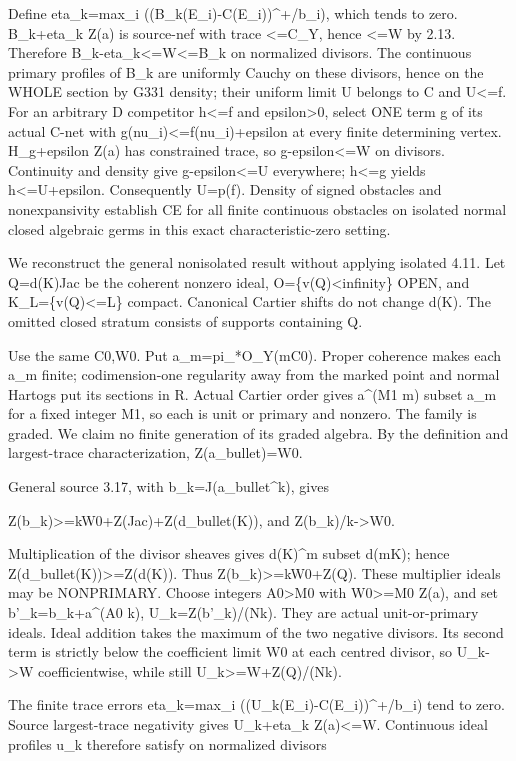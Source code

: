 \documentclass[11pt]{article}
\begin{document}
Define eta\_k=max\_i ((B\_k(E\_i)-C(E\_i))\textasciicircum{}+/b\_i), which tends to zero. B\_k+eta\_k Z(a) is source-nef with trace <=C\_Y, hence <=W by 2.13. Therefore B\_k-eta\_k<=W<=B\_k on normalized divisors. The continuous primary profiles of B\_k are uniformly Cauchy on these divisors, hence on the WHOLE section by G331 density; their uniform limit U belongs to C and U<=f. For an arbitrary D competitor h<=f and epsilon>0, select ONE term g of its actual C-net with g(nu\_i)<=f(nu\_i)+epsilon at every finite determining vertex. H\_g+epsilon Z(a) has constrained trace, so g-epsilon<=W on divisors. Continuity and density give g-epsilon<=U everywhere; h<=g yields h<=U+epsilon. Consequently U=p(f). Density of signed obstacles and nonexpansivity establish CE for all finite continuous obstacles on isolated normal closed algebraic germs in this exact characteristic-zero setting.

We reconstruct the general nonisolated result without applying isolated 4.11. Let Q=d(K)Jac be the coherent nonzero ideal, O=\{v(Q)<infinity\} OPEN, and K\_L=\{v(Q)<=L\} compact. Canonical Cartier shifts do not change d(K). The omitted closed stratum consists of supports containing Q.

Use the same C0,W0. Put a\_m=pi\_*O\_Y(mC0). Proper coherence makes each a\_m finite; codimension-one regularity away from the marked point and normal Hartogs put its sections in R. Actual Cartier order gives a\textasciicircum{}(M1 m) subset a\_m for a fixed integer M1, so each is unit or primary and nonzero. The family is graded. We claim no finite generation of its graded algebra. By the definition and largest-trace characterization, Z(a\_bullet)=W0.

General source 3.17, with b\_k=J(a\_bullet\textasciicircum{}k), gives

Z(b\_k)>=kW0+Z(Jac)+Z(d\_bullet(K)), and Z(b\_k)/k->W0.

Multiplication of the divisor sheaves gives d(K)\textasciicircum{}m subset d(mK); hence Z(d\_bullet(K))>=Z(d(K)). Thus Z(b\_k)>=kW0+Z(Q). These multiplier ideals may be NONPRIMARY. Choose integers A0>M0 with W0>=M0 Z(a), and set b'\_k=b\_k+a\textasciicircum{}(A0 k), U\_k=Z(b'\_k)/(Nk). They are actual unit-or-primary ideals. Ideal addition takes the maximum of the two negative divisors. Its second term is strictly below the coefficient limit W0 at each centred divisor, so U\_k->W coefficientwise, while still U\_k>=W+Z(Q)/(Nk).

The finite trace errors eta\_k=max\_i ((U\_k(E\_i)-C(E\_i))\textasciicircum{}+/b\_i) tend to zero. Source largest-trace negativity gives U\_k+eta\_k Z(a)<=W. Continuous ideal profiles u\_k therefore satisfy on normalized divisors
\end{document}
